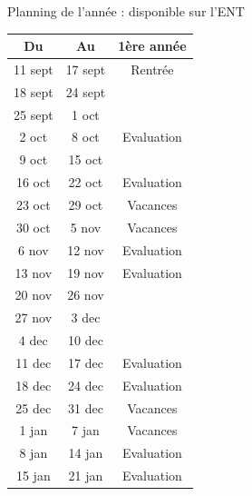 \documentclass [xcolor=x11names,t] {beamer}
\begin{document}
\begin{frame}{Planning de l'année : disponible sur l'ENT} %
\scriptsize
\begin{minipage}{0.45\textwidth}
\begin{tabular}{|c|c|c|}\hline
     \textbf{Du}& \textbf{Au}& \textbf{1ère année} \\ \hline
     \cellcolor{myuniversity!30}11 sept&\cellcolor{myuniversity!30} 17 sept&  \cellcolor{myuniversity!30} Rentrée\\ \hline
     18 sept& 24 sept&  \\ \hline
     25 sept& 1 oct &  \\ \hline
     \cellcolor{red!30} 2 oct& \cellcolor{red!30} 8 oct& \cellcolor{red!30} Evaluation\\ \hline
     9 oct& 15 oct&  \\ \hline
     \cellcolor{red!30} 16 oct& \cellcolor{red!30} 22 oct&  \cellcolor{red!30} Evaluation\\ \hline
     \cellcolor{green!30}23 oct& \cellcolor{green!30}29 oct& \cellcolor{green!30} Vacances \\ \hline
     \cellcolor{green!30}30 oct&\cellcolor{green!30} 5 nov& \cellcolor{green!30} Vacances\\ \hline
     \cellcolor{red!30} 6 nov& \cellcolor{red!30} 12 nov& \cellcolor{red!30} Evaluation\\ \hline
    \cellcolor{red!30} 13 nov&\cellcolor{red!30} 19 nov& \cellcolor{red!30} Evaluation\\ \hline
     20 nov& 26 nov&  \\ \hline
     27 nov& 3 dec&  \\ \hline
     4 dec& 10 dec&  \\ \hline
     \cellcolor{red!30}11 dec& \cellcolor{red!30}17 dec& \cellcolor{red!30} Evaluation \\ \hline
     \cellcolor{red!30}18 dec&\cellcolor{red!30} 24 dec& \cellcolor{red!30} Evaluation \\ \hline
     \cellcolor{green!30}25 dec& \cellcolor{green!30}31 dec&\cellcolor{green!30} Vacances \\ \hline
     \cellcolor{green!30}1 jan&\cellcolor{green!30} 7 jan &\cellcolor{green!30} Vacances \\ \hline\hline
     \cellcolor{red!30}8 jan& \cellcolor{red!30}14 jan &  \cellcolor{red!30}Evaluation\\ \hline
     \cellcolor{red!30}15 jan&\cellcolor{red!30} 21 jan& \cellcolor{red!30} Evaluation\\ \hline

\end{tabular}
\end{minipage}
\end{frame}
\end{document}
